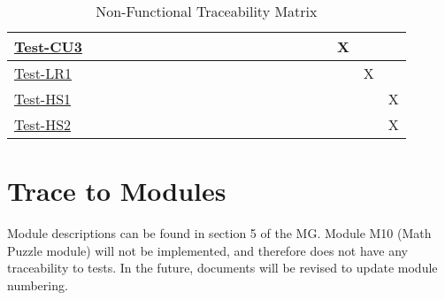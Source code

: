 \documentclass[12pt, titlepage]{article}
\begin{document}
\begin{landscape}
\begin{table}[H]
\begin{adjustwidth}{-0.3in}{-0.5in}
{\begin{tabular}{c|c|c|c|c|c|c|c|c|c|c|c|c|c|c|c|c|c|c|c|c|}
\multicolumn{1}{|l|}{\hyperref[itm:Test-CU3]{Test-CU3}}   &             &             &             &             &             &              &             &             &              &              &              &             &              &             &             &         &&X&&     \\ \hline
\multicolumn{1}{|l|}{\hyperref[itm:Test-LR1]{Test-LR1}}   &             &             &             &             &             &              &             &             &              &              &              &             &              &             &             &         &&&X&     \\ \hline
\multicolumn{1}{|l|}{\hyperref[itm:Test-HS1]{Test-HS1}}   &             &             &             &             &             &              &             &             &              &              &              &             &              &             &             &         &&&& X    \\ \hline
\multicolumn{1}{|l|}{\hyperref[itm:Test-HS2]{Test-HS2}}   &             &             &             &             &             &              &             &             &              &              &              &             &              &             &             &         &&&& X    \\ \hline


\end{tabular}

}
\caption{Non-Functional Traceability Matrix}
    \label{tab:matrix3}
\end{adjustwidth}
\end{table}
\end{landscape}

\section{Trace to Modules}		

Module descriptions can be found in section 5 of the MG. Module M10 (Math Puzzle module) will not be implemented, and therefore does not have any traceability to tests. In the future, documents will be revised to update module numbering.
\end{document}

